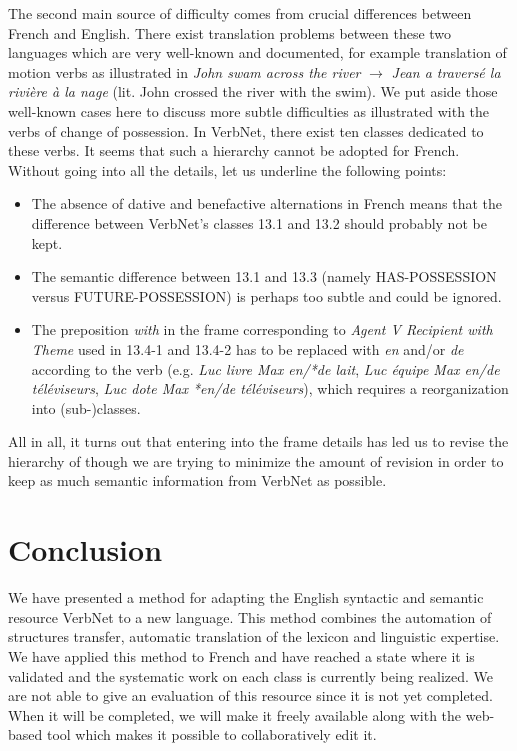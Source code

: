 The second main source of difficulty comes from crucial differences between
French and English. There exist translation problems between these two
languages which are very well-known and documented, for example translation of
motion verbs as illustrated in  \emph{John swam across the river} $\rightarrow$
\emph{Jean a traversé la rivière à la nage} (lit. John crossed the river with
the swim). We put aside those well-known cases here to discuss  more subtle
difficulties as illustrated with the verbs of change of possession. In VerbNet,
there exist ten classes dedicated to these verbs. It seems that such a
hierarchy cannot be adopted for French. Without going into all the details, let
us underline the following points:

\begin{itemize}

    \item  The absence of dative and benefactive alternations in French means that
    the difference between VerbNet's classes 13.1 and 13.2 should probably not be
    kept.

    \item  The semantic difference between 13.1 and 13.3 (namely HAS-POSSESSION
    versus FUTURE-POSSESSION) is perhaps too subtle and could be ignored.

    \item  The preposition \emph{with} in the frame corresponding to \emph{Agent V
    Recipient {with} Theme} used in 13.4-1 and 13.4-2 has to be replaced with
    \emph{en} and/or \emph{de} according to the verb (e.g. \emph{Luc livre Max
    en/*de lait}, \emph{Luc équipe Max en/de téléviseurs}, \emph{Luc dote Max
    *en/de téléviseurs}), which requires a reorganization into (sub-)classes.

\end{itemize}

All in all, it turns out that entering into the frame details has led us to
revise the hierarchy of \verbenet{} though we are trying to minimize the amount
of revision in order to keep as much semantic information from VerbNet as
possible.


\section{Conclusion} We have presented a method for adapting the English
syntactic and semantic resource VerbNet to a new language. This method combines
the automation of structures transfer, automatic translation of the lexicon and
linguistic expertise. We have applied this method to French and have reached a
state where it is validated and the systematic work on each class is currently
being realized.  We are not  able to give an evaluation of this resource since
it is not yet completed. When it will be completed, we will make it freely
available along with the web-based tool which makes it possible to
collaboratively edit it.

